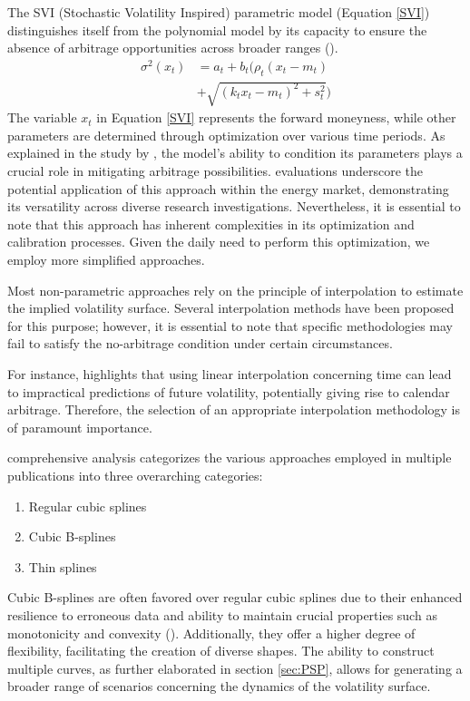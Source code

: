 The SVI (Stochastic Volatility Inspired) parametric model (Equation \eqref{SVI}) distinguishes itself from the polynomial model by its capacity to ensure the absence of arbitrage opportunities across broader ranges (\cite{homescu2011implied}).
\begin{align}
    \sigma^2(x_t) &= a_t + b_t\Big(\rho_t(x_t - m_t) \nonumber \\
    &+ \sqrt{(k_tx_t-m_t)^2+s_t^2}\Big) \label{SVI}
\end{align}
The variable $x_t$ in Equation \eqref{SVI} represents the forward moneyness, while other parameters are determined through optimization over various time periods. As explained in the study by \cite{aurell2014svi}, the model's ability to condition its parameters plays a crucial role in mitigating arbitrage possibilities. \cite{homescu2011implied} evaluations underscore the potential application of this approach within the energy market, demonstrating its versatility across diverse research investigations. Nevertheless, it is essential to note that this approach has inherent complexities in its optimization and calibration processes. Given the daily need to perform this optimization, we employ more simplified approaches.

Most non-parametric approaches rely on the principle of interpolation to estimate the implied volatility surface. Several interpolation methods have been proposed for this purpose; however, it is essential to note that specific methodologies may fail to satisfy the no-arbitrage condition under certain circumstances.

For instance, \cite{clark2011foreign} highlights that using linear interpolation concerning time can lead to impractical predictions of future volatility, potentially giving rise to calendar arbitrage. Therefore, the selection of an appropriate interpolation methodology is of paramount importance.

\cite{homescu2011implied} comprehensive analysis categorizes the various approaches employed in multiple publications into three overarching categories:
\begin{enumerate}
    \item Regular cubic splines
    \item Cubic B-splines
    \item Thin splines
\end{enumerate}
Cubic B-splines are often favored over regular cubic splines due to their enhanced resilience to erroneous data and ability to maintain crucial properties such as monotonicity and convexity (\cite{wolberg2002energy}). Additionally, they offer a higher degree of flexibility, facilitating the creation of diverse shapes. The ability to construct multiple curves, as further elaborated in section \ref{sec:PSP}, allows for generating a broader range of scenarios concerning the dynamics of the volatility surface. 

